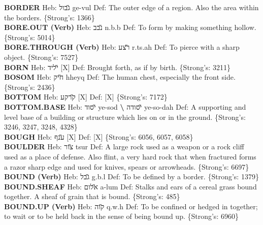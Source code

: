 {\textbf{BORDER} Heb: {\large\H גבול} ge-vul Def: The outer edge of a region. Also the area within the borders. \{Strong's: 1366\}\hfill{}\\

\textbf{BORE.OUT (Verb)} Heb: {\large\H נבב} n.b.b Def: To form by making something hollow. \{Strong's: 5014\}\hfill{}\\

\textbf{BORE.THROUGH (Verb)} Heb: {\large\H רצע} r.ts.ah Def: To pierce with a sharp object. \{Strong's: 7527\}\hfill{}\\

\textbf{BORN} Heb: {\large\H יליד} {[}X{]} Def: Brought forth, as if by birth. \{Strong's: 3211\}\hfill{}\\

\textbf{BOSOM} Heb: {\large\H חיק} hheyq Def: The human chest, especially the front side. \{Strong's: 2436\}\hfill{}\\

\textbf{BOTTOM} Heb: {\large\H קרקע} {[}X{]} Def: {[}X{]} \{Strong's: 7172\}\hfill{}\\

\textbf{BOTTOM.BASE} Heb: {\large\H יסוד} ye-sod \textbf{\textbackslash{}} {\large\H יסודה} ye-so-dah Def: A supporting and level base of a building or structure which lies on or in the ground. \{Strong's: 3246, 3247, 3248, 4328\}\hfill{}\\

\textbf{BOUGH} Heb: {\large\H ענף} {[}X{]} Def: {[}X{]} \{Strong's: 6056, 6057, 6058\}\hfill{}\\

\textbf{BOULDER} Heb: {\large\H צור} tsur Def: A large rock used as a weapon or a rock cliff used as a place of defense. Also flint, a very hard rock that when fractured forms a razor sharp edge and used for knives, spears or arrowheads. \{Strong's: 6697\}\hfill{}\\

\textbf{BOUND (Verb)} Heb: {\large\H גבל} g.b.l Def: To be defined by a border. \{Strong's: 1379\}\hfill{}\\

\textbf{BOUND.SHEAF} Heb: {\large\H אלום} a-lum Def: Stalks and ears of a cereal grass bound together. A sheaf of grain that is bound. \{Strong's: 485\}\hfill{}\\

\textbf{BOUND.UP (Verb)} Heb: {\large\H קוה} q.w.h Def: To be confined or hedged in together; to wait or to be held back in the sense of being bound up. \{Strong's: 6960\}\hfill{}\\

}
